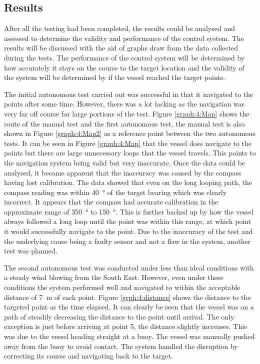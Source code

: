 \subsection{Results}
After all the testing had been completed, the results could be analysed and assessed to determine the validity and performance of the control system. The results will be discussed with the aid of graphs draw from the data collected during the tests. The performance of the control system will be determined by how accurately it stays on the course to the target location and the validity of the system will be determined by if the vessel reached the target points. \par
The initial autonomous test carried out was successful in that it navigated to the points after some time. However, there was a lot lacking as the navigation was very far off course for large portions of the test. Figure \ref{graph:4:Map} shows the route of the manual test and the first autonomous test, the manual test is also shown in Figure \ref{graph:4:Map2} as a reference point between the two autonomous tests. It can be seen in Figure \ref{graph:4:Map} that the vessel does navigate to the points but there are large unnecessary loops that the vessel travels. This points to the navigation system being valid but very inaccurate. Once the data could be analysed, it became apparent that the inaccuracy was caused by the compass having lost calibration. The data showed that even on the long looping path, the compass reading was within \SI{40}{\degree} of the target bearing which was clearly incorrect. It appears that the compass had accurate calibration in the approximate range of \SI{350}{\degree} to \SI{150}{\degree}. This is further backed up by how the vessel always followed a long loop until the point was within this range, at which point it would successfully navigate to the point. Due to the inaccuracy of the test and the underlying cause being a faulty sensor and not a flaw in the system, another test was planned.\par
\vspace{0.6cm}
The second autonomous test was conducted under less than ideal conditions with a steady wind blowing from the South East. However, even under these conditions the system performed well and navigated to within the acceptable distance of \SI{7}{\metre} of each point. Figure \ref{grph:4:distance} shows the distance to the targeted point as the time elapsed. It can clearly be seen that the vessel was on a path of steadily decreasing the distance to the point until arrival. The only exception is just before arriving at point 5, the distance slightly increases. This was due to the vessel heading straight at a buoy. The vessel was manually pushed away from the buoy to avoid contact. The system handled the disruption by correcting its course and navigating back to the target.\par 
